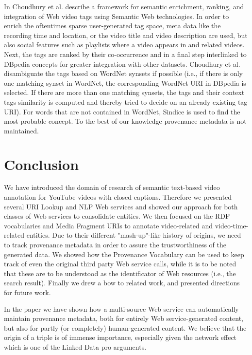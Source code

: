 \documentclass{acm_proc_article-sp}
\begin{document}
In \cite{Choudhury:YouTube} Choudhury et al. describe a framework for semantic enrichment, ranking, and integration of Web video tags using Semantic Web technologies. In order to enrich the oftentimes sparse user-generated tag space, meta data like the recording time and location, or the video title and video description are used, but also social features such as playlists where a video appears in and related videos. Next, the tags are ranked by their co-occurrence and in a final step interlinked to DBpedia concepts for greater integration with other datasets. Choudhury et al. disambiguate the tags based on WordNet\cite{Princeton:WordNet} synsets if possible (i.e., if there is only one matching synset in WordNet, the corresponding WordNet URI in DBpedia is selected. If there are more than one matching synsets, the tags and their context tags similarity is computed and thereby tried to decide on an already existing tag URI). For words that are not contained in WordNet, Sindice is used to find the most probable concept. To the best of our knowledge provenance metadata is not maintained.

\section{Conclusion}\label{sec:conclusion}
We have introduced the domain of research of semantic text-based video annotation for YouTube videos with closed captions. Therefore we presented several URI Lookup and NLP Web services and showed our approach for both classes of Web services to consolidate entities. We then focused on the RDF vocabularies and Media Fragment URIs to annotate video-related and video-time-related entities. Due to their different "mash-up"-like history of origins, we need to track provenance metadata in order to assure the trustworthiness of the generated data. We showed how the Provenance Vocabulary can be used to keep track of even the original third party Web service calls, while it is to be noted that these are to be understood as the identificator of Web resources (i.e., the search result). Finally we drew a bow to related work, and presented directions for future work.

In the paper we have shown how a multi-source Web service can automatically maintain provenance metadata, both for entirely Web service-generated content, but also for partly (or completely) human-generated content. We believe that the origin of a triple is of immense importance, especially given the network effect which is one of the Linked Data pro arguments.
\end{document}
